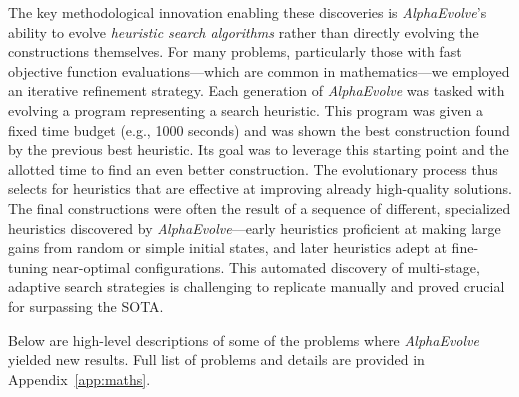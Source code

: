 \documentclass[logo,copyright,12pt]{googledeepmind}
\theoremstyle{definition}
\theoremstyle{remark}
\theoremstyle{plain}
\newcommand{\method}{\emph{AlphaEvolve}\xspace}
\begin{document}
The key methodological innovation enabling these discoveries is \method's ability to evolve \textit{heuristic search algorithms} rather than directly evolving the constructions themselves. For many problems, particularly those with fast objective function evaluations---which are common in mathematics---we employed an iterative refinement strategy. Each generation of \method was tasked with evolving a program representing a search heuristic. This program was given a fixed time budget (e.g., 1000 seconds) and was shown the best construction found by the previous best heuristic. Its goal was to leverage this starting point and the allotted time to find an even better construction. The evolutionary process thus selects for heuristics that are effective at improving already high-quality solutions. The final constructions were often the result of a sequence of different, specialized heuristics discovered by \method---early heuristics proficient at making large gains from random or simple initial states, and later heuristics adept at fine-tuning near-optimal configurations. This automated discovery of multi-stage, adaptive search strategies is challenging to replicate manually and proved crucial for surpassing the SOTA.

Below are high-level descriptions of some of the problems where \method yielded new results. Full list of problems and details are provided in Appendix~\ref{app:maths}.
\end{document}
